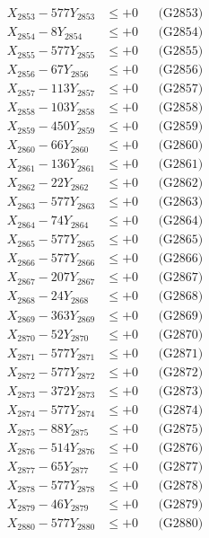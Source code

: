 \documentclass[a4paper,10pt]{article}
\begin{document}
{\begin{align}
X_{2853} - 577Y_{2853} &\leq +0 && \text{(G2853)} \\
X_{2854} - 8Y_{2854} &\leq +0 && \text{(G2854)} \\
X_{2855} - 577Y_{2855} &\leq +0 && \text{(G2855)} \\
X_{2856} - 67Y_{2856} &\leq +0 && \text{(G2856)} \\
X_{2857} - 113Y_{2857} &\leq +0 && \text{(G2857)} \\
X_{2858} - 103Y_{2858} &\leq +0 && \text{(G2858)} \\
X_{2859} - 450Y_{2859} &\leq +0 && \text{(G2859)} \\
X_{2860} - 66Y_{2860} &\leq +0 && \text{(G2860)} \\
\allowbreak
X_{2861} - 136Y_{2861} &\leq +0 && \text{(G2861)} \\
X_{2862} - 22Y_{2862} &\leq +0 && \text{(G2862)} \\
X_{2863} - 577Y_{2863} &\leq +0 && \text{(G2863)} \\
X_{2864} - 74Y_{2864} &\leq +0 && \text{(G2864)} \\
X_{2865} - 577Y_{2865} &\leq +0 && \text{(G2865)} \\
X_{2866} - 577Y_{2866} &\leq +0 && \text{(G2866)} \\
X_{2867} - 207Y_{2867} &\leq +0 && \text{(G2867)} \\
X_{2868} - 24Y_{2868} &\leq +0 && \text{(G2868)} \\
X_{2869} - 363Y_{2869} &\leq +0 && \text{(G2869)} \\
X_{2870} - 52Y_{2870} &\leq +0 && \text{(G2870)} \\
\allowbreak
X_{2871} - 577Y_{2871} &\leq +0 && \text{(G2871)} \\
X_{2872} - 577Y_{2872} &\leq +0 && \text{(G2872)} \\
X_{2873} - 372Y_{2873} &\leq +0 && \text{(G2873)} \\
X_{2874} - 577Y_{2874} &\leq +0 && \text{(G2874)} \\
X_{2875} - 88Y_{2875} &\leq +0 && \text{(G2875)} \\
X_{2876} - 514Y_{2876} &\leq +0 && \text{(G2876)} \\
X_{2877} - 65Y_{2877} &\leq +0 && \text{(G2877)} \\
X_{2878} - 577Y_{2878} &\leq +0 && \text{(G2878)} \\
X_{2879} - 46Y_{2879} &\leq +0 && \text{(G2879)} \\
X_{2880} - 577Y_{2880} &\leq +0 && \text{(G2880)} \\

\end{align}}
\end{document}
